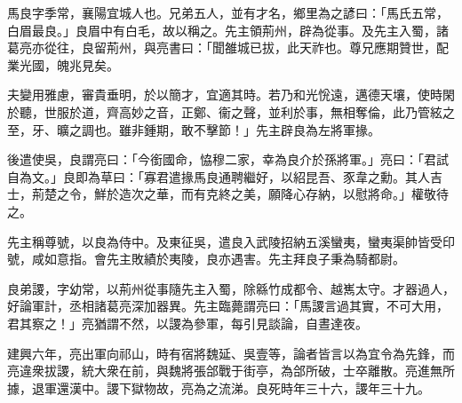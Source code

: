 \begin{pinyinscope}
 
 
 馬良字季常，襄陽宜城人也。兄弟五人，並有才名，鄉里為之諺曰：「馬氏五常，白眉最良。」良眉中有白毛，故以稱之。先主領荊州，辟為從事。及先主入蜀，諸葛亮亦從往，良留荊州，與亮書曰：「聞雒城已拔，此天祚也。尊兄應期贊世，配業光國，魄兆見矣。
 
 
 夫變用雅慮，審貴垂明，於以簡才，宜適其時。若乃和光恱遠，邁德天壤，使時閑於聽，世服於道，齊高妙之音，正鄭、衞之聲，並利於事，無相奪倫，此乃管絃之至，牙、曠之調也。雖非鍾期，敢不擊節！」先主辟良為左將軍掾。
 
 
 
 
 後遣使吳，良謂亮曰：「今銜國命，恊穆二家，幸為良介於孫將軍。」亮曰：「君試自為文。」良即為草曰：「寡君遣掾馬良通聘繼好，以紹昆吾、豕韋之勳。其人吉士，荊楚之令，鮮於造次之華，而有克終之美，願降心存納，以慰將命。」權敬待之。
 
 
 
 
 先主稱尊號，以良為侍中。及東征吳，遣良入武陵招納五溪蠻夷，蠻夷渠帥皆受印號，咸如意指。會先主敗績於夷陵，良亦遇害。先主拜良子秉為騎都尉。
 
 
良弟謖，字幼常，以荊州從事隨先主入蜀，除緜竹成都令、越嶲太守。才器過人，好論軍計，丞相諸葛亮深加器異。先主臨薨謂亮曰：「馬謖言過其實，不可大用，君其察之！」亮猶謂不然，以謖為參軍，每引見談論，自晝達夜。
 
 
建興六年，亮出軍向祁山，時有宿將魏延、吳壹等，論者皆言以為宜令為先鋒，而亮違衆拔謖，統大衆在前，與魏將張郃戰于街亭，為郃所破，士卒離散。亮進無所據，退軍還漢中。謖下獄物故，亮為之流涕。良死時年三十六，謖年三十九。
 
 
\end{pinyinscope}